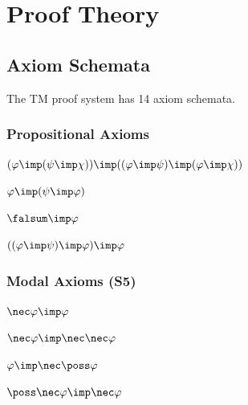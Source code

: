 \documentclass[../BimodalReference.tex]{subfiles}
\begin{document}
\section{Proof Theory}

\subsection{Axiom Schemata}

The TM proof system has 14 axiom schemata.

\subsubsection{Propositional Axioms}

\begin{axiom}[K - Distribution]
$(\varphi \imp (\psi \imp \chi)) \imp ((\varphi \imp \psi) \imp (\varphi \imp \chi))$
\end{axiom}

\begin{axiom}[S - Weakening]
$\varphi \imp (\psi \imp \varphi)$
\end{axiom}

\begin{axiom}
$\falsum \imp \varphi$
\end{axiom}

\begin{axiom}[Peirce]
$((\varphi \imp \psi) \imp \varphi) \imp \varphi$
\end{axiom}

\subsubsection{Modal Axioms (S5)}

\begin{axiom}[MT - Modal T]
$\nec\varphi \imp \varphi$
\end{axiom}

\begin{axiom}[M4 - Modal 4]
$\nec\varphi \imp \nec\nec\varphi$
\end{axiom}

\begin{axiom}[MB - Modal B]
$\varphi \imp \nec\poss\varphi$
\end{axiom}

\begin{axiom}
$\poss\nec\varphi \imp \nec\varphi$
\end{axiom}
\end{document}
